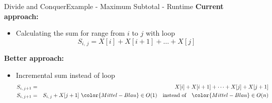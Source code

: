 \begin{frame}{Divide and Conquer}{Example - Maximum Subtotal - Runtime}
  \textbf{Current approach:}
  \begin{itemize}
    \item<2->
      Calculating the sum for range from $i$ to $j$ with loop
      \begin{displaymath}
        S_{i,\,j} = X[i] + X[i+1] + \dots + X[j]
      \end{displaymath}
  \end{itemize}
   \textbf{Better approach:}
   \begin{itemize}
    \item<4->
      Incremental sum instead of loop
      \begin{eqnarray*}
        S_{i,\,j+1} &=& X[i] + X[i+1] + \dots + X[j] + X[j+1]\\
        S_{i,\,j+1} &=& S_{i,\,j} + X[j+1]
        ~{\color{Mittel-Blau}\in O(1)}\hspace{1em} \text{instead of}\hspace{1em} {\color{Mittel-Blau}\in O(n)}
      \end{eqnarray*}
  \end{itemize}
\end{frame}





